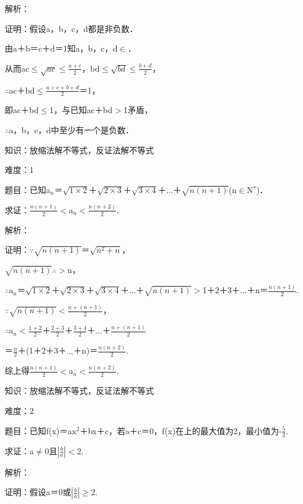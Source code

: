 \documentclass{article} %
\begin{document}
 解析：

 证明：假设a，b，c，d都是非负数．

由a＋b＝c＋d＝1知a，b，c，d$\mathrm{\in}$．

从而ac$\mathrm{\le}$$\sqrt{ac}$$\mathrm{\le}$$\frac{a+c}{2}$，bd$\mathrm{\le}$$\sqrt{bd}$$\mathrm{\le}$$\frac{b+d}{2}$，

$\mathrm{\therefore}$ac＋bd$\mathrm{\le}$$\frac{a+c+b+d}{2}$＝1，

即ac＋bd$\mathrm{\le}$1，与已知ac＋bd$\mathrm{>}$1矛盾，

$\mathrm{\therefore}$a，b，c，d中至少有一个是负数．

 

 知识：放缩法解不等式，反证法解不等式

 难度：1

 题目：已知a${}_{n}$＝$\sqrt{1\times2}$＋$\sqrt{2\times3}$＋$\sqrt{3\times4}$＋{$\dots$}＋$\sqrt{n(n+1)}$(n$\mathrm{\in}$N${}^{*}$)．

 求证：$\frac{n(n+1)}{2}$$\mathrm{<}$a${}_{n}$$\mathrm{<}$$\frac{n(n+2)}{2}$.

 解析：

 证明：$\mathrm{\because}$$\sqrt{n(n+1)}$＝$\sqrt{n^2+n}$，

$\sqrt{n(n+1)}\mathrm{\therefore}$$\mathrm{>}$n，

$\mathrm{\therefore}$a${}_{n}$＝$\sqrt{1\times2}$＋$\sqrt{2\times3}$＋$\sqrt{3\times4}$＋{$\dots$}＋$\sqrt{n(n+1)}$$\mathrm{>}$1＋2＋3＋{$\dots$}＋n＝$\frac{n(n+1)}{2}$.

$\mathrm{\because}$$\sqrt{n(n+1)}$$\mathrm{<}$$\frac{n+(n+1)}{2}$，

$\mathrm{\therefore}$a${}_{n}$$\mathrm{<}$$\frac{1+2}{2}$＋$\frac{2+3}{2}$＋$\frac{3+4}{2}$＋{$\dots$}＋$\frac{n+(n+1)}{2}$

＝$\frac{n}{2}$＋(1＋2＋3＋{$\dots$}＋n)＝$\frac{n(n+2)}{2}$.

综上得$\frac{n(n+1)}{2}\mathrm{<}$a${}_{n}$$\mathrm{<}\frac{n(n+2)}{2}$.



 知识：放缩法解不等式，反证法解不等式

 难度：2

 题目：已知f(x)＝ax${}^{2}$＋bx＋c，若a＋c＝0，f(x)在上的最大值为2，最小值为-$\frac{5}{2}$.

 求证：a$\mathrm{\neq}$0且$|\frac{b}{a}|\mathrm{<}$2.

 解析：

 证明：假设a＝0或$|\frac{b}{a}|\mathrm{\ge}$2.
\end{document}
